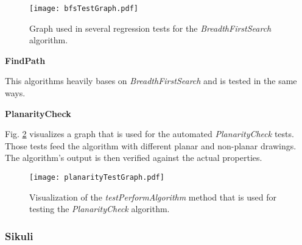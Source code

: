 \begin{figure}[!h]
	\centering
	\texttt{[image: bfsTestGraph.pdf]}
	\caption{Graph used in several regression tests for the \emph{BreadthFirstSearch} algorithm.}
	\label{img:bfsTestGraph}
\end{figure}

\pagebreak
\textbf{FindPath}\par
This algorithms heavily bases on \emph{BreadthFirstSearch} and is tested in the same ways.\par

\textbf{PlanarityCheck}\par
Fig. \ref{img:planarityTestGraph} visualizes a graph that is used for the automated \emph{PlanarityCheck} tests. Those tests feed the algorithm with different planar and non-planar drawings. The algorithm's output is then verified against the actual properties.\par

\begin{figure}[!h]
	\centering
	\texttt{[image: planarityTestGraph.pdf]}
	\caption{Visualization of the \emph{testPerformAlgorithm} method that is used for testing the \emph{PlanarityCheck} algorithm.}
	\label{img:planarityTestGraph}
\end{figure}


\subsubsection{Sikuli}

